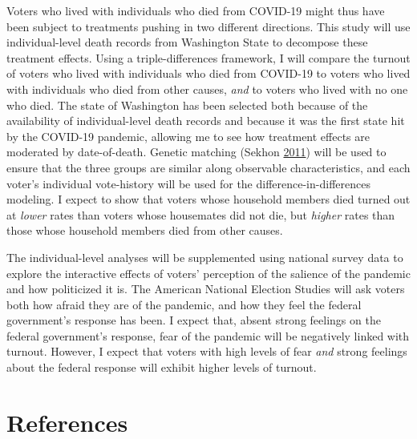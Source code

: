 \documentclass[
  12pt,
]{article}
\begin{document}
Voters who lived with individuals who died from COVID-19 might thus have been subject to treatments pushing in two different directions. This study will use individual-level death records from Washington State to decompose these treatment effects. Using a triple-differences framework, I will compare the turnout of voters who lived with individuals who died from COVID-19 to voters who lived with individuals who died from other causes, \emph{and} to voters who lived with no one who died. The state of Washington has been selected both because of the availability of individual-level death records and because it was the first state hit by the COVID-19 pandemic, allowing me to see how treatment effects are moderated by date-of-death. Genetic matching (Sekhon \protect\hyperlink{ref-Sekhon2011}{2011}) will be used to ensure that the three groups are similar along observable characteristics, and each voter's individual vote-history will be used for the difference-in-differences modeling. I expect to show that voters whose household members died turned out at \emph{lower} rates than voters whose housemates did not die, but \emph{higher} rates than those whose household members died from other causes.

The individual-level analyses will be supplemented using national survey data to explore the interactive effects of voters' perception of the salience of the pandemic and how politicized it is. The American National Election Studies will ask voters both how afraid they are of the pandemic, and how they feel the federal government's response has been. I expect that, absent strong feelings on the federal government's response, fear of the pandemic will be negatively linked with turnout. However, I expect that voters with high levels of fear \emph{and} strong feelings about the federal response will exhibit higher levels of turnout.

\hypertarget{references}{%
\section*{References}\label{references}}
\end{document}
